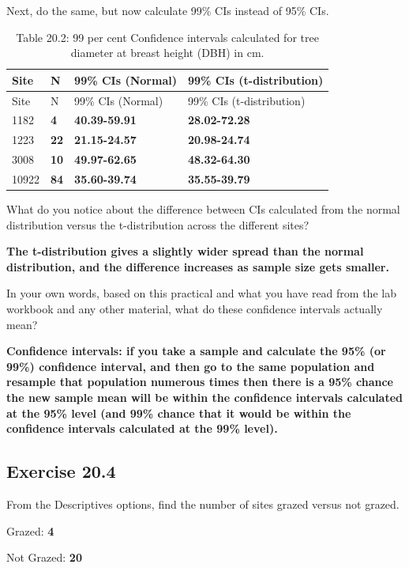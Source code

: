 \documentclass[
  openany]{krantz}
\begin{document}
Next, do the same, but now calculate 99\% CIs instead of 95\% CIs.

\begin{longtable}[]{@{}llll@{}}
\caption{Table 20.2: 99 per cent Confidence intervals calculated for tree diameter at breast height (DBH) in cm.}\tabularnewline
\toprule
Site & N & 99\% CIs (Normal) & 99\% CIs (t-distribution) \\
\midrule
\endfirsthead
\toprule
Site & N & 99\% CIs (Normal) & 99\% CIs (t-distribution) \\
\midrule
\endhead
1182 & \textbf{4} & \textbf{40.39-59.91} & \textbf{28.02-72.28} \\
1223 & \textbf{22} & \textbf{21.15-24.57} & \textbf{20.98-24.74} \\
3008 & \textbf{10} & \textbf{49.97-62.65} & \textbf{48.32-64.30} \\
10922 & \textbf{84} & \textbf{35.60-39.74} & \textbf{35.55-39.79} \\
\bottomrule
\end{longtable}

What do you notice about the difference between CIs calculated from the normal distribution versus the t-distribution across the different sites?

\textbf{The t-distribution gives a slightly wider spread than the normal distribution, and the difference increases as sample size gets smaller.}

In your own words, based on this practical and what you have read from the lab workbook and any other material, what do these confidence intervals actually mean?

\textbf{Confidence intervals: if you take a sample and calculate the 95\% (or 99\%) confidence interval, and then go to the same population and resample that population numerous times then there is a 95\% chance the new sample mean will be within the confidence intervals calculated at the 95\% level (and 99\% chance that it would be within the confidence intervals calculated at the 99\% level).}

\hypertarget{exercise-20.4}{%
\subsection{Exercise 20.4}\label{exercise-20.4}}

From the Descriptives options, find the number of sites grazed versus not grazed.

Grazed: \textbf{4}

Not Grazed: \textbf{20}
\end{document}
